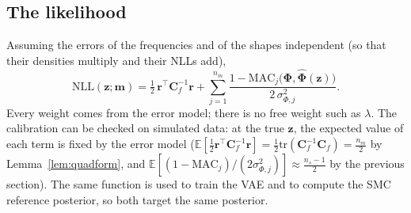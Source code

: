 \documentclass[11pt,a4paper]{article}
\numberwithin{equation}{section}
\theoremstyle{plain}
\theoremstyle{definition}
\theoremstyle{remark}
\newcommand{\m}{\mathbf{m}}
\newcommand{\z}{\mathbf{z}}
\newcommand{\rr}{\mathbf{r}}
\newcommand{\Cb}{\mathbf{C}}
\newcommand{\E}{\mathbb{E}}
\newcommand{\tr}{\mathrm{tr}}
\newcommand{\NLL}{\mathrm{NLL}}
\newcommand{\MAC}{\mathrm{MAC}}
\begin{document}
\subsection{The likelihood}
Assuming the errors of the frequencies and of the shapes independent (so that their densities multiply and their NLLs add),
\begin{equation}
\boxed{\ \NLL(\z;\m)=\tfrac12\,\rr^\top\Cb_f^{-1}\rr+\sum_{j=1}^{n_m}\frac{1-\MAC_j\big(\bm\Phi,\hat{\bm\Phi}(\z)\big)}{2\,\sigma_{\Phi,j}^2}.\ }
\label{eq:nll_revised}
\end{equation}
Every weight comes from the error model; there is no free weight such as $\lambda$. The calibration can be checked on simulated data: at the true $\z$, the expected value of each term is fixed by the error model ($\E[\tfrac12\rr^\top\Cb_f^{-1}\rr]=\tfrac12\tr(\Cb_f^{-1}\Cb_f)=\tfrac{n_m}2$ by Lemma~\ref{lem:quadform}, and $\E[(1-\MAC_j)/(2\sigma_{\Phi,j}^2)]\approx\tfrac{n_s-1}2$ by the previous section). The same function is used to train the VAE and to compute the SMC reference posterior, so both target the same posterior.
\end{document}

